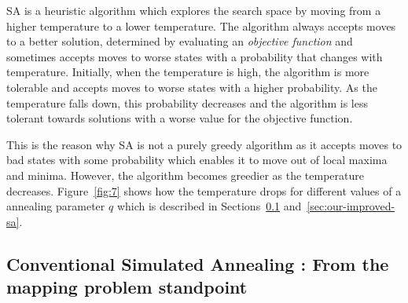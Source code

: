 SA is a heuristic algorithm which explores the search
space by moving from a higher temperature to a lower temperature. The algorithm
always accepts moves to a better solution, determined by evaluating an
\textit{objective function} and sometimes accepts moves to worse states with a
probability that changes with temperature. Initially, when the temperature is
high, the algorithm is more tolerable and accepts moves to worse states with a
higher probability. As the temperature falls down, this probability decreases
and the algorithm is less tolerant towards solutions with a worse value for the
objective function.

This is the reason why SA is not a purely greedy algorithm as it accepts
moves to bad states with some probability which enables it to move out
of local maxima and minima. However, the algorithm becomes greedier as
the temperature decreases. Figure~\ref{fig:7} shows how the temperature
drops for different values of a annealing parameter $q$ which is
described in Sections~\ref{sec:conventional-SA}
and~\ref{sec:our-improved-sa}.

\subsection{Conventional Simulated Annealing : From the mapping problem
  standpoint}
\label{sec:conventional-SA}

